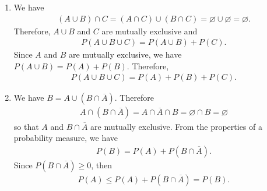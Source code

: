 	\begin{problem}
	\begin{enumerate}[label=\alph*)]
	\item We have
		\begin{align*}
		(A \cup B) \cap C = (A \cap C) \cup (B \cap C) = \varnothing \cup \varnothing = \varnothing .
		\end{align*}
	Therefore, $A \cup B$ and $C$ are mutually exclusive and
		\begin{align*}
		P (A \cup B \cup C) = P (A \cup B ) + P (C) .
		\end{align*}
	Since $A$ and $B$ are mutually exclusive, we have $P (A \cup B) = P (A) + P (B)$. Therefore,
		\begin{align*}
		P (A \cup B \cup C) = P (A) + P (B) + P (C) .
		\end{align*}
	\item We have $B = A \cup (B \cap \overline{A})$. Therefore
		\begin{align*}
		A \cap (B \cap \overline{A}) = A \cap \overline{A} \cap B = \varnothing \cap B = \varnothing
		\end{align*}
	so that $A$ and $B \cap \overline{A}$ are mutually exclusive. From the properties of a probability measure, we have
		\begin{align*}
		P (B) = P (A) + P (B \cap \overline{A}) .
		\end{align*}
	Since $P (B \cap \overline{A}) \geq 0$, then 
		\begin{align*}
		P (A) \leq P (A) + P (B \cap \overline{A}) = P (B) . \tag*{$\triangle$}
		\end{align*}
	\end{enumerate}
	\end{problem}

